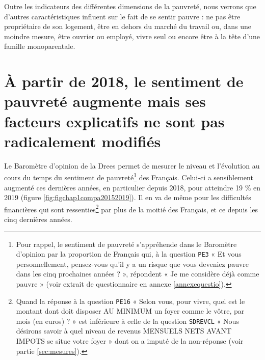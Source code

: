 \documentclass[12pt,a4paper]{reedthesis}
\begin{document}
Outre les indicateurs des différentes dimensions de la pauvreté, nous verrons que d'autres caractéristiques influent sur le fait de se sentir pauvre : ne pas être propriétaire de son logement, être en dehors du marché du travail ou, dans une moindre mesure, être ouvrier ou employé, vivre seul ou encore être à la tête d'une famille monoparentale.

\hypertarget{sec:augmentesubj}{%
\section{À partir de 2018, le sentiment de pauvreté augmente mais ses facteurs explicatifs ne sont pas radicalement modifiés}\label{sec:augmentesubj}}

Le Baromètre d'opinion de la Drees permet de mesurer le niveau et l'évolution au cours du temps du sentiment de pauvreté\footnote{Pour rappel, le sentiment de pauvreté s'appréhende dans le Baromètre d'opinion par la proportion de Français qui, à la question \texttt{PE3} « Et vous personnellement, pensez-vous qu'il y a un risque que vous deveniez pauvre dans les cinq prochaines années ? », répondent « Je me considère déjà comme pauvre » (voir extrait de questionnaire en annexe \ref{annexequestio}).} des Français. Celui-ci a sensiblement augmenté ces dernières années, en particulier depuis 2018, pour atteindre 19 \% en 2019 (figure \ref{fig:figchap1compa20152019}). Il en va de même pour les difficultés financières qui sont ressenties\footnote{Quand la réponse à la question \texttt{PE16} « Selon vous, pour vivre, quel est le montant dont doit disposer AU MINIMUM un foyer comme le vôtre, par mois (en euros) ? » est inférieure à celle de la question \texttt{SDREVCL} « Nous désirons savoir à quel niveau de revenus MENSUELS NETS AVANT IMPOTS se situe votre foyer » dont on a imputé de la non-réponse (voir partie \ref{sec:mesures}).} par plus de la moitié des Français, et ce depuis les cinq dernières années.
\end{document}
